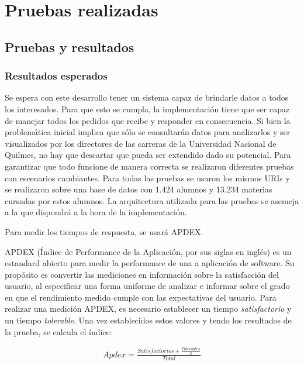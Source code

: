 \chapter{Pruebas realizadas}
\label{sec:implementacion}

\section[Pruebas y resultados]{Pruebas y resultados}

\subsection[Resultados esperados]{Resultados esperados}

Se espera con este desarrollo tener un sistema capaz de brindarle datos a todos los interesados. Para que esto se cumpla, la implementación tiene que ser capaz de manejar todos los pedidos que recibe y responder en consecuencia. 
Si bien la problemática inicial implica que sólo se consultarán datos para analizarlos y ser visualizados por los directores de las carreras de la Universidad Nacional de Quilmes, no hay que descartar que pueda ser extendido dado su potencial.
Para garantizar que todo funcione de manera correcta se realizaron diferentes pruebas con escenarios cambiantes.
Para todas las pruebas se usaron los mismos URIs y se realizaron sobre una base de datos con 1.424 alumnos y 13.234 materias cursadas por estos alumnos.
La arquitectura utilizada para las pruebas se asemeja a la que dispondrá a la hora de la implementación.

Para medir los tiempos de respuesta, se usará APDEX.

APDEX (Índice de Performance de la Aplicación, por sus siglas en inglés) es un estandard abierto para medir la performance de una a aplicación de software. Su propósito es convertir las mediciones en información sobre la satisfacción del usuario, al especificar una forma uniforme de analizar e informar sobre el grado en que el rendimiento medido cumple con las expectativas del usuario.
Para realizar una medición APDEX, es necesario establecer un tiempo \emph{satisfactorio} y un tiempo \emph{tolerable}.
Una vez establecidos estos valores y tendo los resultados de la prueba, se calcula el índice:

\begin{align*}
  Apdex = \frac{Satisfactorios + \frac{Tolerables}{2}}{Total}\\
\end{align*}

